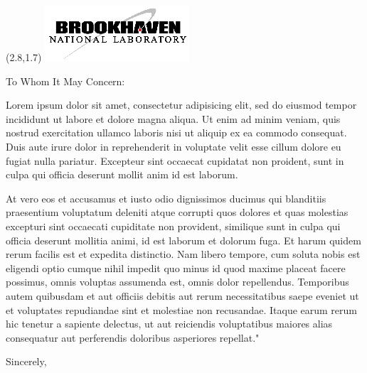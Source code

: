 \documentclass[12pt]{letter}
\begin{document}
\begin{textblock}{2}(2.8,1.7)
\includegraphics[scale=2.0]{bnl-logo}
\end{textblock}

\begin{letter}{}

\opening{To Whom It May Concern:}

Lorem ipsum dolor sit amet, consectetur adipisicing elit, sed do eiusmod tempor
incididunt ut labore et dolore magna aliqua. Ut enim ad minim veniam, quis
nostrud exercitation ullamco laboris nisi ut aliquip ex ea commodo consequat.
Duis aute irure dolor in reprehenderit in voluptate velit esse cillum dolore eu
fugiat nulla pariatur. Excepteur sint occaecat cupidatat non proident, sunt in
culpa qui officia deserunt mollit anim id est laborum.

At vero eos et accusamus et iusto odio dignissimos ducimus qui blanditiis
praesentium voluptatum deleniti atque corrupti quos dolores et quas molestias
excepturi sint occaecati cupiditate non provident, similique sunt in culpa qui
officia deserunt mollitia animi, id est laborum et dolorum fuga. Et harum
quidem rerum facilis est et expedita distinctio. Nam libero tempore, cum soluta
nobis est eligendi optio cumque nihil impedit quo minus id quod maxime placeat
facere possimus, omnis voluptas assumenda est, omnis dolor repellendus.
Temporibus autem quibusdam et aut officiis debitis aut rerum necessitatibus
saepe eveniet ut et voluptates repudiandae sint et molestiae non recusandae.
Itaque earum rerum hic tenetur a sapiente delectus, ut aut reiciendis
voluptatibus maiores alias consequatur aut perferendis doloribus asperiores
repellat."

\closing{Sincerely,}

\end{letter}
\end{document}
